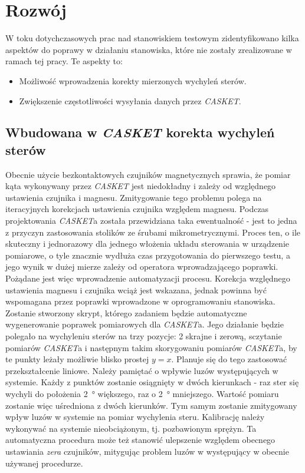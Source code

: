 \section{Rozwój}
\label{sec:rozwoj}
W toku dotychczasowych prac nad stanowiskiem 
testowym \cite{ESAPAC2026_HIL,skromak2026hilall} zidentyfikowano 
kilka aspektów do poprawy w działaniu stanowiska, które
nie zostały zrealizowane w ramach tej pracy. 
Te aspekty to:
\begin{itemize}
    \item Możliwość wprowadzenia korekty mierzonych wychyleń sterów.
    \item Zwiększenie częstotliwości wysyłania danych przez \textit{CASKET}.
\end{itemize}

\subsection{Wbudowana w \textit{CASKET} korekta wychyleń sterów}
\label{subsec:rozwoj-korekta}
Obecnie użycie bezkontaktowych czujników magnetycznych sprawia,
że pomiar kąta wykonywany przez \textit{CASKET} jest niedokładny
i zależy od względnego ustawienia czujnika i magnesu. 
Zmitygowanie tego problemu polega na iteracyjnych korekcjach ustawienia
czujnika względem magnesu. Podczas projektowania \textit{CASKET}a 
została przewidziana taka ewentualność - jest to jedna z przyczyn 
zastosowania stolików ze śrubami mikrometrycznymi. Proces 
ten, o ile skuteczny i jednorazowy dla jednego włożenia układu sterowania w urządzenie pomiarowe, 
o tyle znacznie wydłuża czas przygotowania do pierwszego testu, 
a jego wynik w dużej mierze zależy od operatora wprowadzającego poprawki.
Pożądane jest więc wprowadzenie automatyzacji procesu. 
Korekcja względnego ustawienia magnesu i czujnika wciąż jest 
wskazana, jednak powinna być wspomagana przez poprawki wprowadzone
w oprogramowaniu stanowiska.
Zostanie stworzony skrypt, którego zadaniem będzie automatyczne
wygenerowanie poprawek pomiarowych dla \textit{CASKET}a.
Jego działanie będzie polegało na wychyleniu sterów na trzy pozycje:
2 skrajne i zerową, sczytanie pomiarów \textit{CASKET}a
i następnym takim skorygowaniu pomiarów \textit{CASKET}a, by 
te punkty leżały możliwie blisko prostej \(y = x\).
Planuje się do tego zastosować przekształcenie liniowe.
Należy pamiętać o wpływie luzów występujących w systemie.
Każdy z punktów zostanie osiągnięty w dwóch kierunkach - raz
ster się wychyli do położenia \SI{2}{\degree} większego, raz o \SI{2}{\degree} mniejszego. Wartość pomiaru zostanie więc uśredniona z dwóch kierunków.
Tym samym zostanie zmitygowany wpływ luzów w systemie na pomiar wychylenia steru.
Kalibrację należy wykonywać na systemie nieobciążonym, tj. pozbawionym sprężyn.
Ta automatyczna procedura może też stanowić ulepszenie 
względem obecnego ustawiania \textit{zera} czujników, mitygując
problem luzów w występujący w obecnie używanej procedurze.

